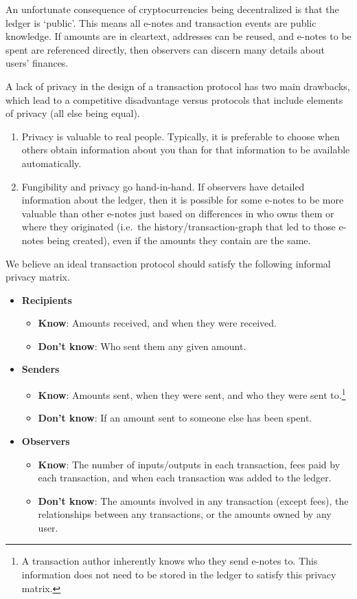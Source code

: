 An unfortunate consequence of cryptocurrencies being decentralized is that the ledger is `public'. This means all e-notes and transaction events are public knowledge. If amounts are in cleartext, addresses can be reused, and e-notes to be spent are referenced directly, then observers can discern many details about users' finances.

A lack of privacy in the design of a transaction protocol has two main drawbacks, which lead to a competitive disadvantage versus protocols that include elements of privacy (all else being equal).

\begin{enumerate}
    \item Privacy is valuable to real people. Typically, it is preferable to choose when others obtain information about you than for that information to be available automatically.
    \item Fungibility and privacy go hand-in-hand. If observers have detailed information about the ledger, then it is possible for some e-notes to be more valuable than other e-notes just based on differences in who owns them or where they originated (i.e.\ the history/transaction-graph that led to those e-notes being created), even if the amounts they contain are the same.
\end{enumerate}

We believe an ideal transaction protocol should satisfy the following informal privacy matrix.

\begin{itemize}
    \item \textbf{Recipients}
    \begin{itemize}
        \item \textbf{Know}: Amounts received, and when they were received.
        \item \textbf{Don't know}: Who sent them any given amount.
    \end{itemize}
    \item \textbf{Senders}
    \begin{itemize}
        \item \textbf{Know}: Amounts sent, when they were sent, and who they were sent to.\footnote{A transaction author inherently knows who they send e-notes to. This information does not need to be stored in the ledger to satisfy this privacy matrix.}
        \item \textbf{Don't know}: If an amount sent to someone else has been spent.
    \end{itemize}
    \item \textbf{Observers}
    \begin{itemize}
        \item \textbf{Know}: The number of inputs/outputs in each transaction, fees paid by each transaction, and when each transaction was added to the ledger.
        \item \textbf{Don't know}: The amounts involved in any transaction (except fees), the relationships between any transactions, or the amounts owned by any user.
    \end{itemize}
\end{itemize}

